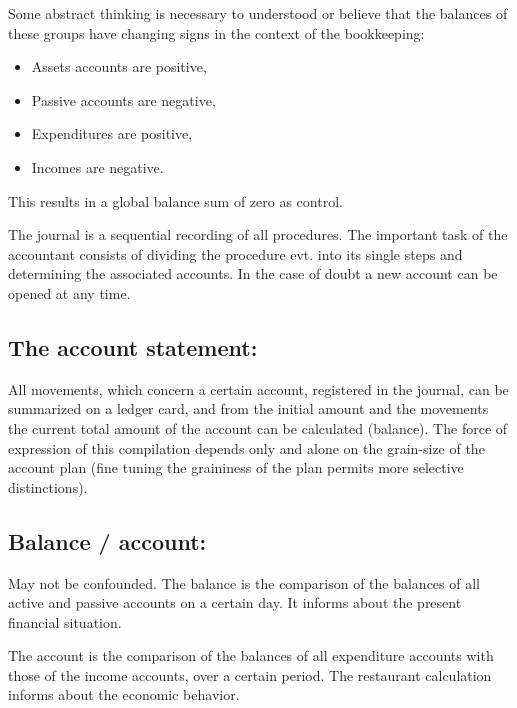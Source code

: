 Some abstract thinking is necessary to understood or believe that the balances
of these groups have changing signs in the context of the bookkeeping:



\begin{itemize}

\item Assets accounts are positive,

\item Passive accounts are negative,

\item Expenditures are positive,

\item Incomes are negative.

\end{itemize}


This results in a global balance sum of zero as control.


The journal is a sequential recording of all procedures.  The important task of
the accountant consists of dividing the procedure evt. into its single steps
and determining the associated accounts.  In the case of doubt a new account
can be opened at any time.



\subsection{The account statement:}

All movements, which concern a certain account, registered in the journal, can
be summarized on a ledger card, and from the initial amount and the movements
the current total amount of the account can be calculated (balance).  The force
of expression of this compilation depends only and alone on the grain-size of
 the account plan (fine tuning the graininess of the plan permits more selective distinctions).



\subsection{ Balance / account:} 

 May not be confounded.  The balance is the comparison of the balances of
all active and passive accounts on a certain day.  It informs about the present
financial situation.

 The account is the comparison of the balances of all expenditure accounts
with those of the income accounts, over a certain period.  The restaurant
calculation informs about the economic behavior.



